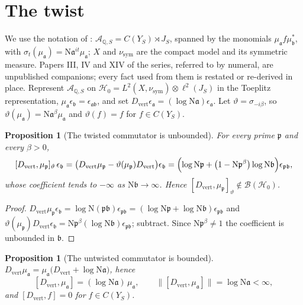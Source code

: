 \documentclass[11pt]{amsart}
\numberwithin{equation}{section}
\newtheorem{proposition}[theorem]{Proposition}
\theoremstyle{definition}
\theoremstyle{remark}
\newcommand{\Q}{\mathbb{Q}}
\newcommand{\cA}{\mathcal{A}}
\newcommand{\cH}{\mathcal{H}}
\newcommand{\pp}{\mathfrak{p}}
\newcommand{\aaa}{\mathfrak{a}}
\newcommand{\bb}{\mathfrak{b}}
\newcommand{\Ns}{\mathrm{N}}
\newcommand{\Dv}{D_{\mathrm{vert}}}
\newcommand{\nusym}{\nu_{\mathrm{sym}}}
\begin{document}
\maketitle

\section{The twist}

We use the notation of \cite{Main}: $\cA_{\Q,S}=C(Y_S)\rtimes J_S$, spanned by the monomials
$\mu_\aaa f\mu_\bb^*$, with $\sigma_t(\mu_\aaa)=\Ns\aaa^{it}\mu_\aaa$; $X$ and $\nusym$ are
the compact model and its symmetric measure. Papers III, IV and XIV of the series, referred
to by numeral, are unpublished companions; every fact used from them is restated or
re-derived in place. Represent $\cA_{\Q,S}$ on $\cH_0=L^2(X,\nusym)\otimes\ell^2(J_S)$ in the Toeplitz
representation, $\mu_\aaa\epsilon_\bb=\epsilon_{\aaa\bb}$, and set
$\Dv\epsilon_\aaa=(\log\Ns\aaa)\epsilon_\aaa$. Let $\vartheta=\sigma_{-i\beta}$, so
$\vartheta(\mu_\aaa)=\Ns\aaa^{\beta}\mu_\aaa$ and $\vartheta(f)=f$ for $f\in C(Y_S)$.

\begin{proposition}[The twisted commutator is unbounded]\label{prop:unbounded}
For every prime $\pp$ and every $\beta>0$,
\begin{equation}\label{eq:twist}
[\Dv,\mu_\pp]_\vartheta\,\epsilon_\bb
=\bigl(\Dv\mu_\pp-\vartheta(\mu_\pp)\Dv\bigr)\epsilon_\bb
=\Bigl(\log\Ns\pp+\bigl(1-\Ns\pp^{\beta}\bigr)\log\Ns\bb\Bigr)\epsilon_{\pp\bb},
\end{equation}
whose coefficient tends to $-\infty$ as $\Ns\bb\to\infty$. Hence
$[\Dv,\mu_\pp]_\vartheta\notin\mathcal B(\cH_0)$.
\end{proposition}

\begin{proof}
$\Dv\mu_\pp\epsilon_\bb=\log\Ns(\pp\bb)\epsilon_{\pp\bb}=(\log\Ns\pp+\log\Ns\bb)\epsilon_{\pp\bb}$
and $\vartheta(\mu_\pp)\Dv\epsilon_\bb=\Ns\pp^{\beta}(\log\Ns\bb)\epsilon_{\pp\bb}$;
subtract. Since $\Ns\pp^\beta\ne1$ the coefficient is unbounded in $\bb$.
\end{proof}

\begin{proposition}[The untwisted commutator is bounded]\label{prop:bounded}
$\Dv\mu_\aaa=\mu_\aaa\bigl(\Dv+\log\Ns\aaa\bigr)$, hence
\[
[\Dv,\mu_\aaa]=(\log\Ns\aaa)\,\mu_\aaa,\qquad \bigl\|[\Dv,\mu_\aaa]\bigr\|=\log\Ns\aaa<\infty,
\]
and $[\Dv,f]=0$ for $f\in C(Y_S)$.
\end{proposition}
\end{document}
